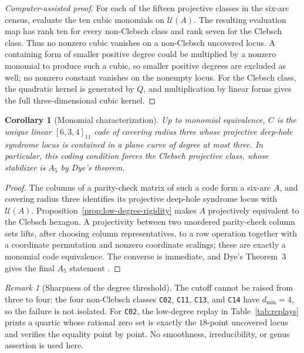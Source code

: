 \documentclass[11pt]{article}
\newtheorem{corollary}[theorem]{Corollary}
\theoremstyle{remark}
\newtheorem{remark}[theorem]{Remark}
\newcommand{\cU}{\mathcal{U}}
\begin{document}
\begin{proof}[Computer-assisted proof]
For each of the fifteen projective classes in the six-arc census, evaluate
the ten cubic monomials on $\cU(A)$. The resulting evaluation map has rank
ten for every non-Clebsch class and rank seven for the Clebsch class. Thus
no nonzero cubic vanishes on a non-Clebsch uncovered locus. A containing
form of smaller positive degree could be multiplied by a nonzero monomial
to produce such a cubic, so smaller positive degrees are excluded as well;
no nonzero constant vanishes on the nonempty locus. For the
Clebsch class, the quadratic kernel is generated by $Q$, and multiplication
by linear forms gives the full three-dimensional cubic kernel.
\end{proof}

\begin{corollary}[Monomial characterization]
\label{cor:monomial-characterization}
Up to monomial equivalence, $C$ is the unique linear $[6,3,4]_{11}$ code of
covering radius three whose projective deep-hole syndrome locus is contained
in a plane curve of degree at most three. In particular, this coding
condition forces the Clebsch projective class, whose stabilizer is $A_5$ by
Dye's theorem.
\end{corollary}

\begin{proof}
The columns of a parity-check matrix of such a code form a six-arc $A$, and
covering radius three identifies its projective deep-hole syndrome locus
with $\cU(A)$. Proposition~\ref{prop:low-degree-rigidity} makes $A$ projectively equivalent
to the Clebsch hexagon. A projectivity between two unordered parity-check
column sets lifts, after choosing column representatives, to a row operation
together with a coordinate permutation and nonzero coordinate scalings;
these are exactly a monomial code equivalence. The converse is immediate,
and Dye's Theorem~3 gives the final $A_5$ statement
\cite[p.~278]{Dye1991}.
\end{proof}

\begin{remark}[Sharpness of the degree threshold]
\label{rem:degree-threshold}
The cutoff cannot be raised from three to four: the four non-Clebsch
classes \texttt{C02}, \texttt{C11}, \texttt{C13}, and \texttt{C14} have
$d_{\min}=4$, so the failure is not isolated. For \texttt{C02}, the
low-degree replay in Table~\ref{tab:replays} prints a quartic whose rational
zero set is exactly the $18$-point uncovered locus and verifies the equality
point by point. No smoothness, irreducibility, or genus assertion is used
here.
\end{remark}
\end{document}
